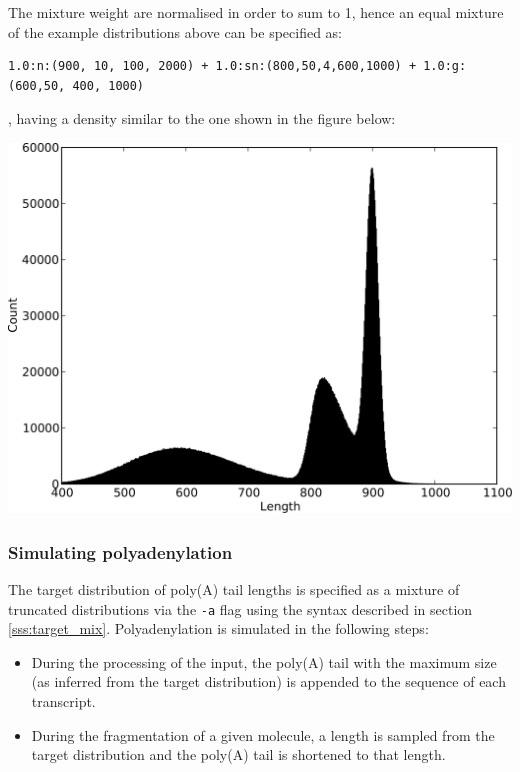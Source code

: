 The mixture weight are normalised in order to sum to 1, hence an equal mixture of the example distributions above can be specified as:

\begin{verbatim}
1.0:n:(900, 10, 100, 2000) + 1.0:sn:(800,50,4,600,1000) + 1.0:g:(600,50, 400, 1000)
\end{verbatim}

, having a density similar to the one shown in the figure below:

\begin{center}
\includegraphics[scale=0.5]{pix/target_mix.png}
\end{center}

\subsubsection{Simulating polyadenylation}
\label{sss:polya_sim}

The target distribution of poly(A) tail lengths is specified as a mixture of truncated distributions via the {\tt -a} flag using the syntax described in section \ref{sss:target_mix}. Polyadenylation is simulated in the following steps:

\begin{itemize}
    \item During the processing of the input, the poly(A) tail with the maximum size (as inferred from the target distribution) is appended to the sequence of each transcript. 
    \item During the fragmentation of a given molecule, a length is sampled from the target distribution and the poly(A) tail is shortened to that length.
\end{itemize}

